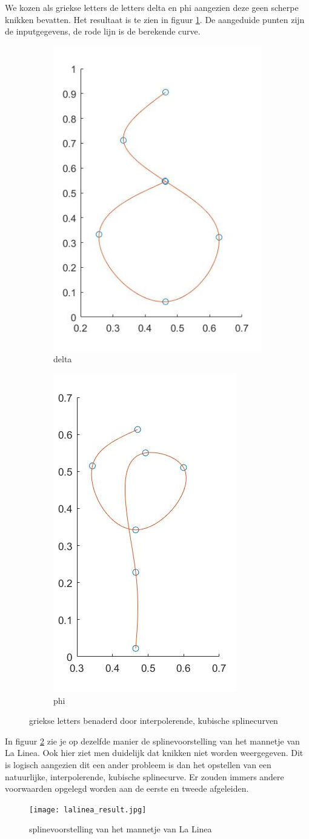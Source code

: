 We kozen als griekse letters de letters delta en phi aangezien deze geen scherpe knikken bevatten. Het resultaat is te zien in figuur \ref{fig:griekse_letters}. De aangeduide punten zijn de inputgegevens, de rode lijn is de berekende curve.

\begin{figure}
\centering
\begin{subfigure}{.5\textwidth}
  \centering
  \includegraphics[width=.4\linewidth]{afbeeldingen/delta_result.jpg}
  \caption{delta}
\end{subfigure}%
\begin{subfigure}{.5\textwidth}
  \centering
  \includegraphics[width=.4\linewidth]{afbeeldingen/phi_result.jpg}
  \caption{phi}
\end{subfigure}
\caption{griekse letters benaderd door interpolerende, kubische splinecurven}
\label{fig:griekse_letters}
\end{figure}

In figuur \ref{fig:lalinea} zie je op dezelfde manier de splinevoorstelling van het mannetje van La Linea. Ook hier ziet men duidelijk dat knikken niet worden weergegeven. Dit is logisch aangezien dit een ander probleem is dan het opstellen van een natuurlijke, interpolerende, kubische splinecurve. Er zouden immers andere voorwaarden opgelegd worden aan de eerste en tweede afgeleiden.

\begin{figure}[htb]
    \centering
    \texttt{[image: lalinea\_result.jpg]}
    \caption{splinevoorstelling van het mannetje van La Linea}
    \label{fig:lalinea}
\end{figure}